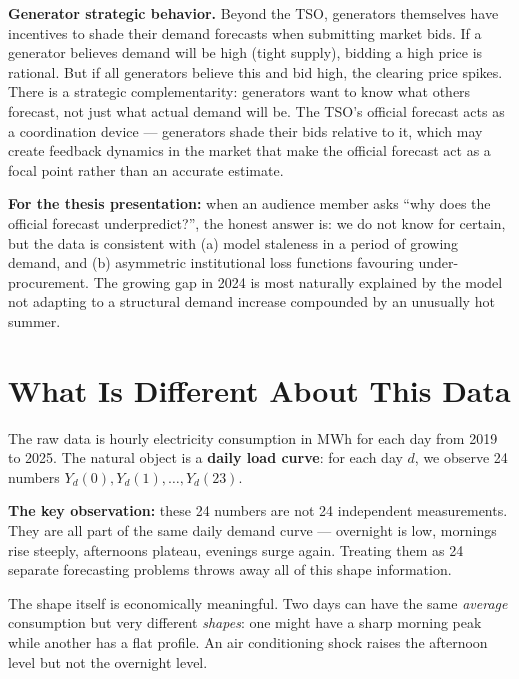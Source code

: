 \documentclass[11pt,a4paper]{article}
\begin{document}
\textbf{Generator strategic behavior.}
Beyond the TSO, generators themselves have incentives to shade
their demand forecasts when submitting market bids. If a generator
believes demand will be high (tight supply), bidding a high price
is rational. But if all generators believe this and bid high, the
clearing price spikes. There is a strategic complementarity:
generators want to know what others forecast, not just what actual
demand will be. The TSO's official forecast acts as a coordination
device --- generators shade their bids relative to it, which may
create feedback dynamics in the market that make the official
forecast act as a focal point rather than an accurate estimate.

\begin{intuitionbox}
\textbf{For the thesis presentation:} when an audience member asks
``why does the official forecast underpredict?'', the honest answer
is: we do not know for certain, but the data is consistent with
(a) model staleness in a period of growing demand, and (b) asymmetric
institutional loss functions favouring under-procurement.
The growing gap in 2024 is most naturally explained by the model not
adapting to a structural demand increase compounded by an unusually hot summer.
\end{intuitionbox}

\section{What Is Different About This Data}

The raw data is hourly electricity consumption in MWh for each day from
2019 to 2025. The natural object is a \textbf{daily load curve}: for
each day $d$, we observe 24 numbers $Y_d(0), Y_d(1), \ldots, Y_d(23)$.

\begin{intuitionbox}
\textbf{The key observation:} these 24 numbers are not 24 independent
measurements. They are all part of the same daily demand curve ---
overnight is low, mornings rise steeply, afternoons plateau, evenings
surge again. Treating them as 24 separate forecasting problems throws
away all of this shape information.
\end{intuitionbox}

The shape itself is economically meaningful. Two days can have the same
\emph{average} consumption but very different \emph{shapes}: one might
have a sharp morning peak while another has a flat profile. An air
conditioning shock raises the afternoon level but not the overnight level.
\end{document}
